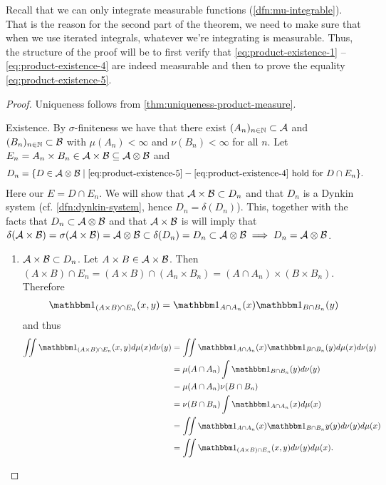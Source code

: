 Recall that we can only integrate measurable functions (\autoref{dfn:mu-integrable}). That is the reason for the second part of the theorem, we need to make sure that when we use iterated integrals, whatever we're integrating is measurable. Thus, the structure of the proof will be to first verify that \ref{eq:product-existence-1} -- \ref{eq:product-existence-4} are indeed measurable and then to prove the equality \ref{eq:product-existence-5}.

\begin{proof}
	Uniqueness follows from \autoref{thm:uniqueness-product-measure}.
	
	Existence. By $\sigma$-finiteness we have that there exist $(A_n)_{n\in\mathbb{N}} \subset \mathcal{A}$ and $(B_n)_{n\in\mathbb{N}} \subset \mathcal{B}$ with $\mu(A_n) < \infty$ and $\nu(B_n) < \infty$ for all $n$. Let $E_n = A_n \times B_n \in \mathcal{A} \times \mathcal{B} \subseteq \mathcal{A} \otimes \mathcal{B}$ and
	\begin{align}
		D_n = \{ D \in \mathcal{A} \otimes \mathcal{B} \mid \ref{eq:product-existence-5} - \ref{eq:product-existence-4} \text{ hold for } D \cap E_n\}.
	\end{align}
	Here our $E = D \cap E_n$. We will show that $\mathcal{A} \times \mathcal{B} \subset D_n$ and that $D_n$ is a Dynkin system (cf. \autoref{dfn:dynkin-system}, hence $D_n = \delta(D_n)$). This, together with the facts that $D_n \subset \mathcal{A} \otimes \mathcal{B}$ and that $\mathcal{A} \times \mathcal{B}$ is \istable will imply that $\delta(\mathcal{A} \times \mathcal{B}) = \sigma(\mathcal{A} \times \mathcal{B}) = \mathcal{A} \otimes \mathcal{B} \subset \delta(D_n) = D_n \subset \mathcal{A} \otimes \mathcal{B} \implies D_n = \mathcal{A} \otimes \mathcal{B}$.
	
	\begin{enumerate}
		\item $\mathcal{A} \times \mathcal{B} \subset D_n$. Let $A \times B \in \mathcal{A} \times \mathcal{B}$. Then $(A \times B) \cap E_n = (A \times B) \cap (A_n \times B_n) = (A \cap A_n) \times (B \times B_n)$. Therefore
		\begin{align*}
			\ind_{(A \times B) \cap E_n}(x, y) = \ind_{A \cap A_n}(x)\ind_{B \cap B_n}(y)
		\end{align*}
		and thus
		\begin{align*}
			\iint \ind_{(A \times B) \cap E_n}(x, y) d\mu(x)d\nu(y)
			&= \iint \ind_{A \cap A_n}(x)\ind_{B \cap B_n}(y) d\mu(x)d\nu(y) \\
			&= \mu(A \cap A_n) \int \ind_{B \cap B_n}(y) d\nu(y) \\
			&= \mu(A \cap A_n) \nu(B \cap B_n) \\
			&= \nu(B \cap B_n) \int \ind_{A \cap A_n}(x) d\mu(x) \\
			&= \iint \ind_{A \cap A_n}(x) \ind_{B \cap B_n}y(y) d\nu(y) d\mu(x)\\
			&= \iint \ind_{(A \times B) \cap E_n}(x, y) d\nu(y)d\mu(x).
		\end{align*}
		

\end{enumerate}
\end{proof}
